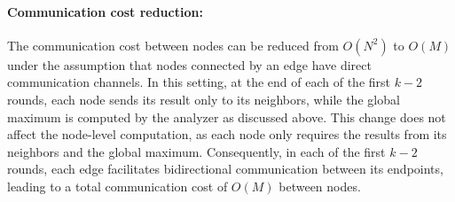 \paragraph{Communication cost reduction:}

The communication cost between nodes can be reduced from $O(N^2)$ to $O(M)$ under the assumption that nodes connected by an edge have direct communication channels. 
In this setting, at the end of each of the first $k-2$ rounds, each node sends its result only to its neighbors, while the global maximum is computed by the analyzer as discussed above. 
This change does not affect the node-level computation, as each node only requires the results from its neighbors and the global maximum. 
Consequently, in each of the first $k-2$ rounds, each edge facilitates bidirectional communication between its endpoints, leading to a total communication cost of $O(M)$ between nodes.





\begin{algorithm}
\small
\caption{Local randomizer $\mathcal{R}^{(\ell)}$ of optimized $\mathcal{M}_{\mathrm{k\text{-}wk}}$}
\label{alg:k-wk-opt_randomizer}
\SetNoFillComment


\end{algorithm}



